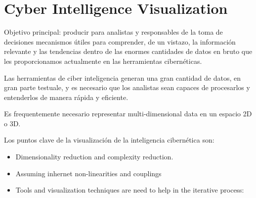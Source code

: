 \chapter{Cyber Intelligence Visualization}

Objetivo principal: producir para analistas y responsables de la toma de decisiones mecanismos útiles para
comprender, de un vistazo, la información relevante y las tendencias dentro de las enormes cantidades
de datos en bruto que les proporcionamos actualmente en las herramientas cibernéticas.

Las herramientas  de ciber inteligencia generan una gran cantidad de datos, en gran parte testuale, y es necesario que los analistas sean capaces de procesarlos y entenderlos de manera rápida y eficiente.

Es frequentemente necesario representar multi-dimensional data en un espacio 2D o 3D.

Los puntos clave de la visualización de la inteligencia cibernética son:
\begin{itemize}
   \item Dimensionality reduction and complexity reduction.
   \item Assuming inhernet non-linearities and couplings
   \item Tools and visualization techniques are need to help in the iterative process:
   
\end{itemize}